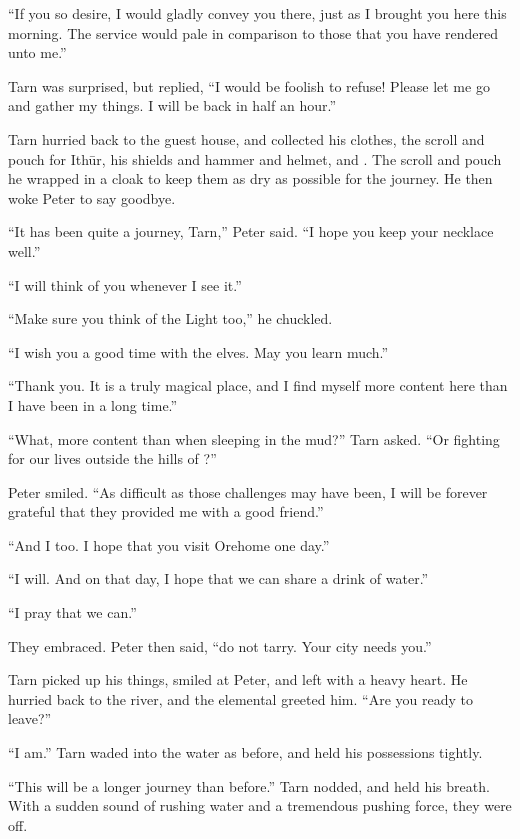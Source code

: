 ``If you so desire, I would gladly convey you there, just as I brought you here this morning.  The service would pale in comparison to those that you have rendered unto me.''

Tarn was surprised, but replied, ``I would be foolish to refuse!  Please let me go and gather my things.  I will be back in half an hour.''

Tarn hurried back to the guest house, and collected his clothes, the scroll and pouch for Ith\=ur, his shields and hammer and helmet, and \kildir.  The scroll and pouch he wrapped in a cloak to keep them as dry as possible for the journey.  He then woke Peter to say goodbye.

``It has been quite a journey, Tarn,'' Peter said.  ``I hope you keep your necklace well.''

``I will think of you whenever I see it.''

``Make sure you think of the Light too,'' he chuckled.

``I wish you a good time with the elves.  May you learn much.''

``Thank you. It is a truly magical place, and I find myself more content here than I have been in a long time.''

``What, more content than when sleeping in the mud?'' Tarn asked.  ``Or fighting for our lives outside the hills of \tholkunrond?''

Peter smiled.  ``As difficult as those challenges may have been, I will be forever grateful that they provided me with a good friend.''

``And I too.  I hope that you visit Orehome one day.''

``I will.  And on that day, I hope that we can share a drink of water.''

``I pray that we can.''

They embraced.  Peter then said, ``do not tarry.  Your city needs you.''

Tarn picked up his things, smiled at Peter, and left with a heavy heart.  He hurried back to the river, and the elemental greeted him.  ``Are you ready to leave?''

``I am.''  Tarn waded into the water as before, and held his possessions tightly.

``This will be a longer journey than before.''  Tarn nodded, and held his breath.  With a sudden sound of rushing water and a tremendous pushing force, they were off.

